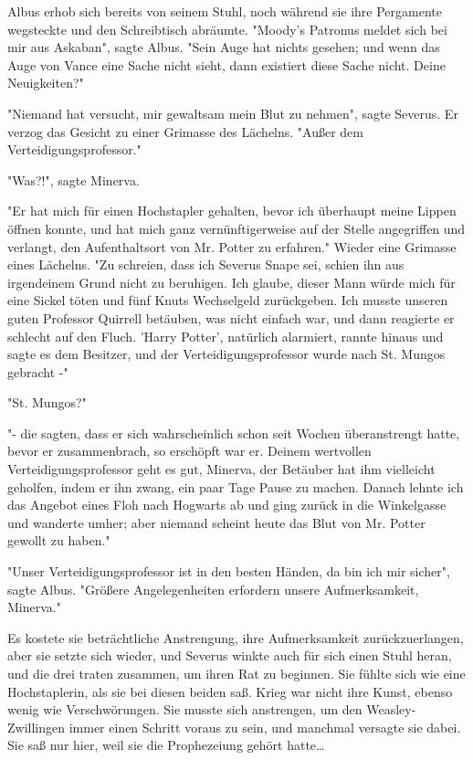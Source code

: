 {Albus erhob sich bereits von seinem Stuhl, noch während sie ihre Pergamente wegsteckte und den Schreibtisch abräumte. "Moody's Patronus meldet sich bei mir aus Askaban", sagte Albus. "Sein Auge hat nichts gesehen; und wenn das Auge von Vance eine Sache nicht sieht, dann existiert diese Sache nicht. Deine Neuigkeiten?"

"Niemand hat versucht, mir gewaltsam mein Blut zu nehmen", sagte Severus. Er verzog das Gesicht zu einer Grimasse des Lächelns. "Außer dem Verteidigungsprofessor."

"Was?!", sagte Minerva.

"Er hat mich für einen Hochstapler gehalten, bevor ich überhaupt meine Lippen öffnen konnte, und hat mich ganz vernünftigerweise auf der Stelle angegriffen und verlangt, den Aufenthaltsort von Mr. Potter zu erfahren." Wieder eine Grimasse eines Lächelns. "Zu schreien, dass ich Severus Snape sei, schien ihn aus irgendeinem Grund nicht zu beruhigen. Ich glaube, dieser Mann würde mich für eine Sickel töten und fünf Knuts Wechselgeld zurückgeben. Ich musste unseren guten Professor Quirrell betäuben, was nicht einfach war, und dann reagierte er schlecht auf den Fluch. 'Harry Potter', natürlich alarmiert, rannte hinaus und sagte es dem Besitzer, und der Verteidigungsprofessor wurde nach St. Mungos gebracht -"

"St. Mungos?"

"- die sagten, dass er sich wahrscheinlich schon seit Wochen überanstrengt hatte, bevor er zusammenbrach, so erschöpft war er. Deinem wertvollen Verteidigungsprofessor geht es gut, Minerva, der Betäuber hat ihm vielleicht geholfen, indem er ihn zwang, ein paar Tage Pause zu machen. Danach lehnte ich das Angebot eines Floh nach Hogwarts ab und ging zurück in die Winkelgasse und wanderte umher; aber niemand scheint heute das Blut von Mr. Potter gewollt zu haben."

"Unser Verteidigungsprofessor ist in den besten Händen, da bin ich mir sicher", sagte Albus. "Größere Angelegenheiten erfordern unsere Aufmerksamkeit, Minerva."

Es kostete sie beträchtliche Anstrengung, ihre Aufmerksamkeit zurückzuerlangen, aber sie setzte sich wieder, und Severus winkte auch für sich einen Stuhl heran, und die drei traten zusammen, um ihren Rat zu beginnen. Sie fühlte sich wie eine Hochstaplerin, als sie bei diesen beiden saß. Krieg war nicht ihre Kunst, ebenso wenig wie Verschwörungen. Sie musste sich anstrengen, um den Weasley-Zwillingen immer einen Schritt voraus zu sein, und manchmal versagte sie dabei. Sie saß nur hier, weil sie die Prophezeiung gehört hatte…

}
